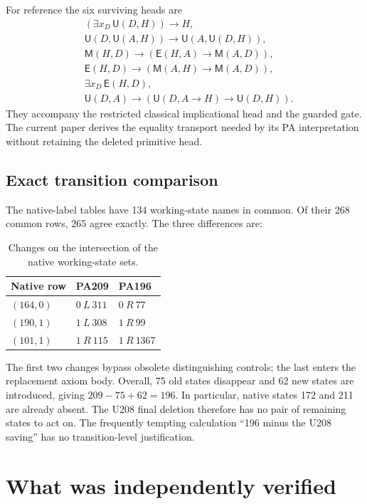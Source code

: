 \documentclass[11pt,letterpaper]{article}
\newcommand{\M}{\mathsf M}
\newcommand{\U}{\mathsf U}
\newcommand{\E}{\mathsf E}
\begin{document}
For reference the six surviving heads are
\begin{align*}
 &(\exists x_D\,\U(D,H))\to H,\\
 &\U(D,\U(A,H))\to\U(A,\U(D,H)),\\
 &\M(H,D)\to(\E(H,A)\to\M(A,D)),\\
 &\E(H,D)\to(\M(A,H)\to\M(A,D)),\\
 &\exists x_D\,\E(H,D),\\
 &\U(D,A)\to(\U(D,A\to H)\to\U(D,H)).
\end{align*}
They accompany the restricted classical implicational head and the guarded
gate. The current paper derives the equality transport needed by its PA
interpretation without retaining the deleted primitive head.

\subsection{Exact transition comparison}

The native-label tables have 134 working-state names in common. Of their
268 common rows, 265 agree exactly. The three differences are:
\begin{table}[ht]
\centering
\begin{tabular}{@{}lll@{}}
\toprule
Native row & PA209 & PA196\\
\midrule
$(164,0)$ & $0\ L\ 311$ & $0\ R\ 77$\\
$(190,1)$ & $1\ L\ 308$ & $1\ R\ 99$\\
$(101,1)$ & $1\ R\ 115$ & $1\ R\ 1367$\\
\bottomrule
\end{tabular}
\caption{Changes on the intersection of the native working-state sets.}
\end{table}

The first two changes bypass obsolete distinguishing controls; the last
enters the replacement axiom body. Overall, 75 old states disappear and
62 new states are introduced, giving $209-75+62=196$. In particular,
native states 172 and 211 are already absent. The U208 final deletion
therefore has no pair of remaining states to act on. The frequently
tempting calculation ``196 minus the U208 saving'' has no transition-level
justification.

\section{What was independently verified}
\label{sec:verification}
\end{document}
